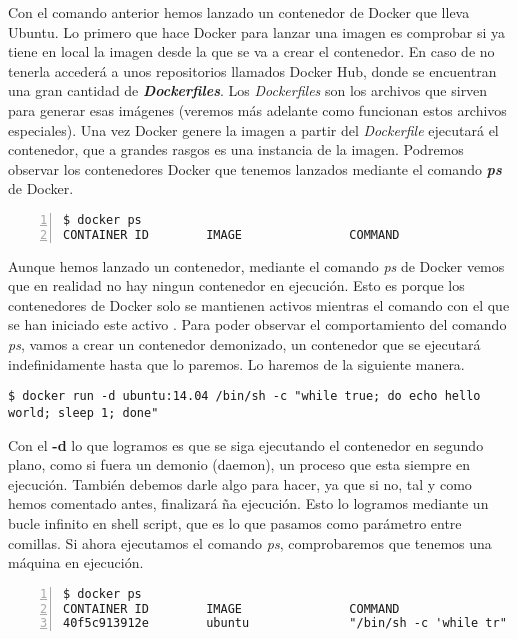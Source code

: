 	Con el comando anterior hemos lanzado un contenedor de Docker que lleva Ubuntu. Lo primero que hace Docker para lanzar una imagen es comprobar si ya tiene en local la imagen desde la que se va a crear el contenedor. En caso de no tenerla accederá a unos repositorios llamados Docker Hub, donde se encuentran una gran cantidad de \textbf{\emph{Dockerfiles}}. Los \emph{Dockerfiles} son los archivos que sirven para generar esas imágenes (veremos más adelante como funcionan estos archivos especiales). Una vez Docker genere la imagen a partir del \textit{Dockerfile} ejecutará el contenedor, que a grandes rasgos es una instancia de la imagen. Podremos observar los contenedores Docker que tenemos lanzados mediante el comando \textbf{\emph{ps}} de Docker.
	
	\begin{lstlisting}[style=consola,numbers=left]
$ docker ps
CONTAINER ID        IMAGE               COMMAND                  CREATED             STATUS              PORTS               NAMES
	\end{lstlisting}
	
	Aunque hemos lanzado un contenedor, mediante el comando \emph{ps} de Docker vemos que en realidad no hay ningun contenedor en ejecución. Esto es porque los contenedores de Docker solo se mantienen activos mientras el comando con el que se han iniciado este activo \cite{docker-run}. Para poder observar el comportamiento del comando \emph{ps}, vamos a crear un contenedor demonizado, un contenedor que se ejecutará indefinidamente hasta que lo paremos. Lo haremos de la siguiente manera.
	
	\begin{lstlisting}[style=consola]
$ docker run -d ubuntu:14.04 /bin/sh -c "while true; do echo hello world; sleep 1; done"
	\end{lstlisting}
	
	Con el \textbf{-d} lo que logramos es que se siga ejecutando el contenedor en segundo plano, como si fuera un demonio (daemon), un proceso que esta siempre en ejecución. También debemos darle algo para hacer, ya que si no, tal y como hemos comentado antes, finalizará ña ejecución. Esto lo logramos mediante un bucle infinito en shell script, que es lo que pasamos como parámetro entre comillas. Si ahora ejecutamos el comando \emph{ps}, comprobaremos que tenemos una máquina en ejecución.
	
	\begin{lstlisting}[style=consola,numbers=left]
$ docker ps
CONTAINER ID        IMAGE               COMMAND                  CREATED             STATUS              PORTS               NAMES
40f5c913912e        ubuntu              "/bin/sh -c 'while tr"   2 seconds ago       Up 2 seconds                            adoring_euclid
	\end{lstlisting}
	
